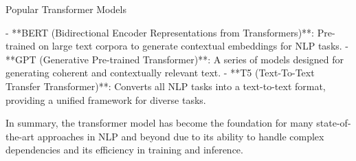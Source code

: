  Popular Transformer Models

- **BERT (Bidirectional Encoder Representations from Transformers)**: Pre-trained on large text corpora to generate contextual embeddings for NLP tasks.
- **GPT (Generative Pre-trained Transformer)**: A series of models designed for generating coherent and contextually relevant text.
- **T5 (Text-To-Text Transfer Transformer)**: Converts all NLP tasks into a text-to-text format, providing a unified framework for diverse tasks.

In summary, the transformer model has become the foundation for many state-of-the-art approaches in NLP and beyond due to its ability to handle complex dependencies and its efficiency in training and inference.
